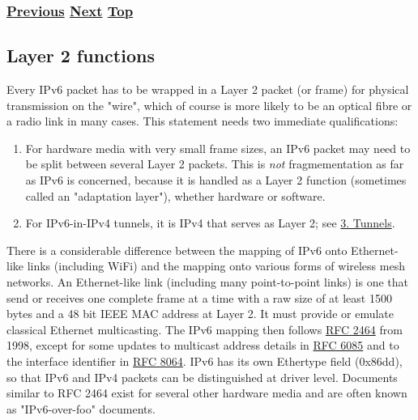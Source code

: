 \documentclass[
]{article}
\begin{document}
\subsubsection{\texorpdfstring{\hyperref[packet-format]{Previous}
\hyperref[layer-2-functions]{Next}
\hyperref[ipv6-basic-technology]{Top}}{Previous Next Top}}\label{previous-next-top-8}

\pagebreak

\subsection{Layer 2 functions}\label{layer-2-functions}

Every IPv6 packet has to be wrapped in a Layer 2 packet (or frame) for
physical transmission on the "wire", which of course is more likely to
be an optical fibre or a radio link in many cases. This statement needs
two immediate qualifications:

\begin{enumerate}
\def\labelenumi{\arabic{enumi}.}
\item
  For hardware media with very small frame sizes, an IPv6 packet may
  need to be split between several Layer 2 packets. This is \emph{not}
  fragmementation as far as IPv6 is concerned, because it is handled as
  a Layer 2 function (sometimes called an "adaptation layer"), whether
  hardware or software.
\item
  For IPv6-in-IPv4 tunnels, it is IPv4 that serves as Layer 2; see
  \hyperref[tunnels]{3. Tunnels}.
\end{enumerate}

There is a considerable difference between the mapping of IPv6 onto
Ethernet-like links (including WiFi) and the mapping onto various forms
of wireless mesh networks. An Ethernet-like link (including many
point-to-point links) is one that send or receives one complete frame at
a time with a raw size of at least 1500 bytes and a 48 bit IEEE MAC
address at Layer 2. It must provide or emulate classical Ethernet
multicasting. The IPv6 mapping then follows
\href{https://www.rfc-editor.org/info/rfc2464}{RFC 2464} from 1998,
except for some updates to multicast address details in
\href{https://www.rfc-editor.org/info/rfc6085}{RFC 6085} and to the
interface identifier in
\href{https://www.rfc-editor.org/info/rfc8064}{RFC 8064}. IPv6 has its
own Ethertype field (0x86dd), so that IPv6 and IPv4 packets can be
distinguished at driver level. Documents similar to RFC 2464 exist for
several other hardware media and are often known as "IPv6-over-foo"
documents.
\end{document}
